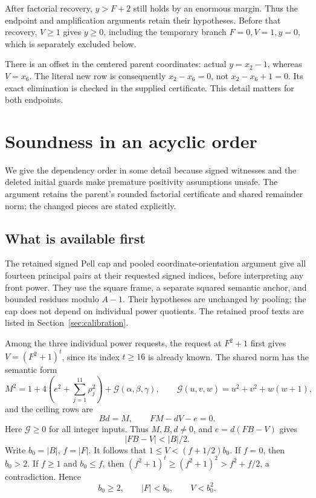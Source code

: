 \documentclass[11pt,letterpaper]{article}
\theoremstyle{definition}\newtheorem{definition}[theorem]{Definition}
\theoremstyle{remark}\newtheorem{remark}[theorem]{Remark}
\newcommand{\G}{\mathcal G}
\begin{document}
After factorial recovery, \(y>F+2\) still holds by an enormous margin.
Thus the endpoint and amplification arguments retain their hypotheses.
Before that recovery, \(V\ge1\) gives \(y\ge0\), including the
temporary branch \(F=0,V=1,y=0\), which is separately excluded below.

There is an offset in the centered parent coordinates: actual
\(y=x_2-1\), whereas \(V=x_6\). The literal new row is consequently
\(x_2-x_6=0\), not \(x_2-x_6+1=0\). Its exact elimination is checked
in the supplied certificate. This detail matters for both endpoints.

\section{Soundness in an acyclic order}
\label{sec:bootstrap}

We give the dependency order in some detail because signed witnesses and
the deleted initial guards make premature positivity assumptions unsafe.
The argument retains the parent's rounded factorial certificate and
shared remainder norm; the changed pieces are stated explicitly.

\subsection{What is available first}

The retained signed Pell cap and pooled coordinate-orientation argument
give all fourteen principal pairs at their requested signed indices,
before interpreting any front power. They use the square frame, a
separate squared semantic anchor, and bounded residues modulo \(A-1\).
Their hypotheses are unchanged by pooling; the cap does not depend on
individual power quotients. The retained proof texts are listed in
Section~\ref{sec:calibration}.

Among the three individual power requests, the request at \(F^2+1\)
first gives \(V=(F^2+1)^t\), since its index \(t\ge16\) is already known.
The shared norm has the semantic form
\begin{equation}\label{eq:jointnorm}
M^2=1+4\left(e^2+\sum_{j=1}^{11}\rho_j^2\right)+\G(\alpha,\beta,\gamma),
\qquad \G(u,v,w)=u^2+v^2+w(w+1),
\end{equation}
and the ceiling rows are
\begin{equation}\label{eq:ceiling}
Bd=M,\qquad FM-dV-e=0.
\end{equation}
Here \(\G\ge0\) for all integer inputs. Thus \(M,B,d\ne0\), and
\(e=d(FB-V)\) gives
\begin{equation}\label{eq:halfwidth}
|FB-V|<|B|/2.
\end{equation}
Write \(b_0=|B|\), \(f=|F|\). It follows that
\(1\le V<(f+1/2)b_0\). If \(f=0\), then \(b_0>2\). If
\(f\ge1\) and \(b_0\le f\), then
\((f^2+1)^t\ge(f^2+1)^2>f^2+f/2\), a contradiction. Hence
\begin{equation}\label{eq:frontmagnitudes}
b_0\ge2,\qquad |F|<b_0,\qquad V<b_0^2.
\end{equation}
\end{document}
